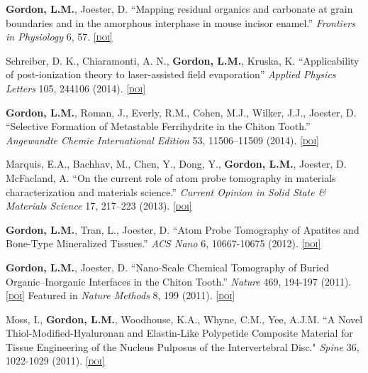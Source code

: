 \textbf{Gordon, L.M.}, Joester, D. “Mapping residual organics and carbonate at grain boundaries and in the amorphous interphase in mouse incisor enamel.” \emph{Frontiers in Physiology} 6, 57.  \href{http://dx.doi.org/10.3389/fphys.2014.00509}{\textsc{\footnotesize{[doi]}}}

Schreiber, D. K., Chiaramonti, A. N., \textbf{Gordon, L.M.}, Kruska, K. “Applicability of post-ionization theory to laser-assisted field evaporation” \emph{Applied Physics Letters} 105, 244106 (2014). \href{http://dx.doi.org/10.1063/1.4904802}{\textsc{\footnotesize{[doi]}}}

\textbf{Gordon, L.M.}, Roman, J., Everly, R.M., Cohen, M.J., Wilker, J.J., Joester, D. “Selective Formation of Metastable Ferrihydrite in the Chiton Tooth.” \emph{Angewandte Chemie International Edition} 53, 11506–11509 (2014). 
\href{http://dx.doi.org/10.1002/anie.201406131}{\textsc{\footnotesize{[doi]}}}


Marquis, E.A., Bachhav, M., Chen, Y., Dong, Y., \textbf{Gordon, L.M.}, Joester, D. McFacland, A. ``On the current role of atom probe tomography in materials characterization and materials science.'' \emph{Current Opinion in Solid State \& Materials Science} 17, 217–223 (2013). \href{http://dx.doi.org/10.1016/j.cossms.2013.09.003}{\textsc{\footnotesize{[doi]}}}

\textbf{Gordon, L.M.}, Tran, L., Joester, D. “Atom Probe Tomography of Apatites and Bone-Type Mineralized Tissues.” \emph{ACS Nano} 6, 10667-10675 (2012). \href{http://dx.doi.org/10.1021/nn3049957}{\textsc{\footnotesize{[doi]}}}

\textbf{Gordon, L.M.}, Joester, D. “Nano-Scale Chemical Tomography of Buried Organic--Inorganic Interfaces in the Chiton Tooth.” \emph{Nature} 469, 194-197 (2011). \href{http://dx.doi.org/10.1038/nature09686}{\textsc{\footnotesize{[doi]}}} Featured in \emph{Nature Methods} 8, 199 (2011). \href{http://dx.doi.org/10.1038/nmeth0311-199}{\textsc{\footnotesize{[doi]}}}

Moss, I., \textbf{Gordon, L.M.}, Woodhouse, K.A., Whyne, C.M., Yee, A.J.M. ``A Novel Thiol-Modified-Hyaluronan and Elastin-Like Polypetide Composite Material for Tissue Engineering of the Nucleus Pulposus of the Intervertebral Disc." \emph{Spine} 36, 1022-1029 (2011). \href{http://dx.doi.org/10.1097/BRS.0b013e3181e7b705}{\textsc{\footnotesize{[doi]}}}

